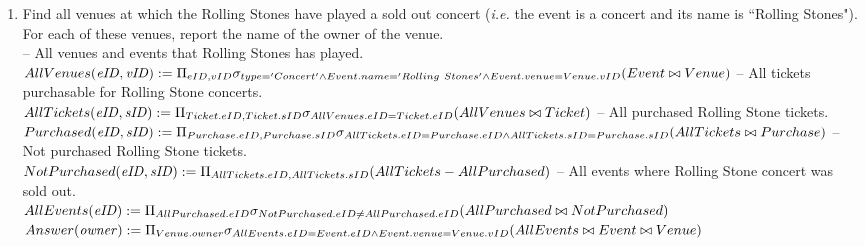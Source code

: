 \documentclass{article}
\newcommand{\var}[1]{\mathit{#1}}
\begin{document}
\begin{enumerate}
\item   %
Find all venues at which the Rolling Stones have played a sold out concert
({\it i.e.} the event is a concert and its name is ``Rolling Stones").
For each of these venues, report the name of the owner of the venue. \\[5pt]
-- All venues and events that Rolling Stones has played. \\[5pt]
{ \large
$
AllVenues(\var{eID, vID}) := 
	\Pi_{eID, vID} 
	\sigma_{
		type='Concert' \wedge
		Event.name='Rolling \ Stones' \wedge
		Event.venue=Venue.vID 
		}\\
	(Event \bowtie Venue) \\[10pt]
$
}
-- All tickets purchasable for Rolling Stone concerts. \\[5pt]
{ \large
$
AllTickets(\var{eID, sID}) := 
	\Pi_{Ticket.eID, Ticket.sID} 
	\sigma_{
		AllVenues.eID=Ticket.eID}
	(AllVenues \bowtie Ticket)\\[10pt]
$
}
-- All purchased Rolling Stone tickets. \\[5pt]
{ \large
$
Purchased(\var{eID, sID}) := 
	\Pi_{Purchase.eID, Purchase.sID} \\
	\sigma_{
		AllTickets.eID=Purchase.eID \wedge
		AllTickets.sID=Purchase.sID
		} 
	(AllTickets \bowtie Purchase ) \\[10pt]
$
}
-- Not purchased Rolling Stone tickets. \\[5pt]
{ \large
$
NotPurchased(\var{eID, sID}) := 
	\Pi_{AllTickets.eID, AllTickets.sID} 
	(AllTickets - AllPurchased ) \\[10pt]
$
}
-- All events where Rolling Stone concert was sold out. \\[5pt]
{ \large
$
AllEvents(\var{eID}) := \\
	\Pi_{AllPurchased.eID} 
	\sigma_{
		NotPurchased.eID \neq AllPurchased.eID
		} 
	(AllPurchased \bowtie NotPurchased ) \\[10pt]
$
$
Answer(\var{owner}) := \\
	\Pi_{Venue.owner} 
	\sigma_{
		AllEvents.eID=Event.eID \wedge
		Event.venue=Venue.vID
		}
	(AllEvents \bowtie Event \bowtie Venue) \\[10pt]
$
}


\end{enumerate}
\end{document}
